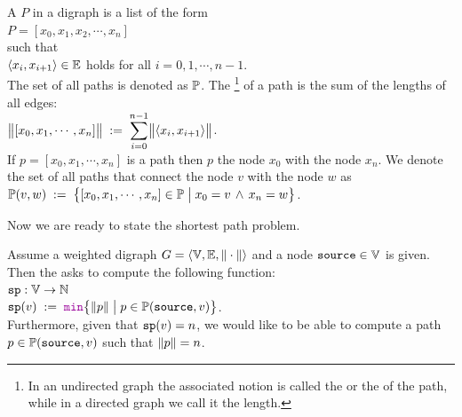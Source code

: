 \begin{Definition}
 A  $P$ in a digraph  is a list of the form 
\\[0.2cm]
\hspace*{1.3cm} 
$P = [ x_0, x_1, x_2, \cdots, x_n ]$ 
\\[0.2cm]
such that
\\[0.2cm]
\hspace*{1.3cm} $\pair(x_i,x_{i+1}) \in \edges$ \quad holds for all $i = 0, 1, \cdots, n-1$. 
\\[0.2cm]
The set of all paths is denoted as ${\mathbb P}$.
The \footnote{In an undirected graph the associated notion is called the  or the
   of the path, while in a directed graph we call it the length.} of a path  is the sum of the lengths of all edges:
\\[0.2cm]
\hspace*{1.3cm}
$\ds\Weight{[x_0,x_1, \cdots, x_n]} \df \sum\limits_{i=0}^{n-1} \Weight{\pair(x_i,x_{i+1})}$. 
\\[0.2cm]
If  $p = [x_0, x_1, \cdots, x_n]$ is a path then  $p$   the node $x_0$ with the node
$x_n$.  We denote the set of all paths that connect the node $v$ with the node $w$ as
\\[0.2cm]
\hspace*{1.3cm} 
 ${\mathbb P}(v,w) \;:=\; \bigl\{ [x_0, x_1, \cdots, x_n] \in {\mathbb P} \bigm| x_0 = v \,\wedge\, x_n = w \bigr\}$.
\end{Definition}

\noindent
Now we are ready to state the shortest path problem.

\begin{Definition} \lb
  Assume a weighted digraph  
  $G = \langle {\mathbb V}, {\mathbb E}, \|\cdot\| \rangle$ 
  and a node $\mbox{\tt source} \in {\mathbb V}$ is given.  Then the  
  asks to compute the following function:
  \\[0.2cm]
  \hspace*{1.3cm} $\mathtt{sp}: {\mathbb V} \rightarrow {\mathbb N}$ \\[0.1cm]
  \hspace*{1.3cm} $\spath(v) \df \mytt{min}\bigl\{ \weight{p} \bigm| p \in \paths(\source,v) \bigr\}$.
  \\[0.2cm]
  Furthermore, given that $\mathtt{sp}(v) = n$, we would like to be able to compute a path 
  $p \in {\mathbb P}(\mbox{\tt source},v)$ such that $\|p\| = n$.
  \eox
\end{Definition}

